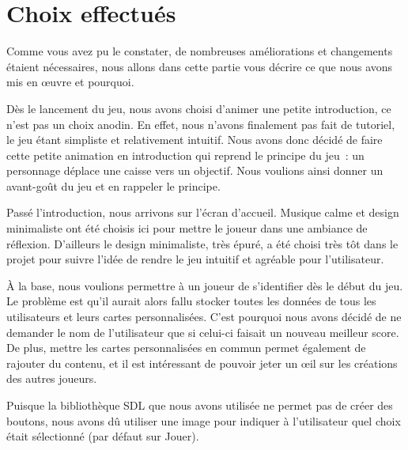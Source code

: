 \documentclass[english,11pt]{report}
\begin{document}
\chapter{Choix effectués}

Comme vous avez pu le constater, de nombreuses améliorations et changements étaient nécessaires, nous allons dans cette partie vous décrire ce que nous avons mis en œuvre et pourquoi.\par
\vspace{0,5cm}
Dès le lancement du jeu, nous avons choisi d’animer une petite introduction, ce n’est pas un choix anodin. En effet, nous n’avons finalement pas fait de tutoriel, le jeu étant simpliste et relativement intuitif. Nous avons donc décidé de faire cette petite animation en introduction qui reprend le principe du jeu : un personnage déplace une caisse vers un objectif. Nous voulions ainsi donner un avant-goût du jeu et en rappeler le principe.\par
\vspace{0,2cm}
Passé l’introduction, nous arrivons sur l’écran d’accueil. Musique calme et design minimaliste ont été choisis ici pour mettre le joueur dans une ambiance de réflexion. D’ailleurs le design minimaliste, très épuré, a été choisi très tôt dans le projet pour suivre l’idée de rendre le jeu intuitif et agréable pour l’utilisateur.\par
\vspace{0,2cm}
À la base, nous voulions permettre à un joueur de s’identifier dès le début du jeu. Le problème est qu’il aurait alors fallu stocker toutes les données de tous les utilisateurs et leurs cartes personnalisées. C’est pourquoi nous avons décidé de ne demander le nom de l’utilisateur que si celui-ci faisait un nouveau meilleur score. De plus, mettre les cartes personnalisées en commun permet également de rajouter du contenu, et il est intéressant de pouvoir jeter un œil sur les créations des autres joueurs.\par
\vspace{0,2cm}
Puisque la bibliothèque SDL que nous avons utilisée ne permet pas de créer des boutons, nous avons dû utiliser une image pour indiquer à l’utilisateur quel choix était sélectionné (par défaut sur Jouer).\par
\end{document}
